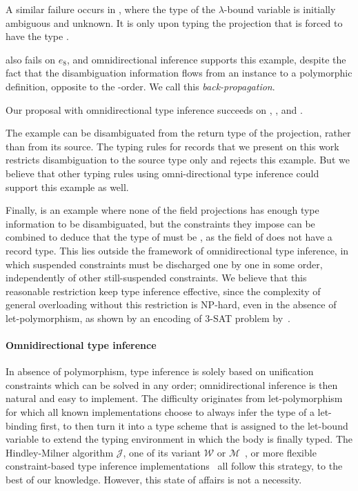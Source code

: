 \documentclass[acmsmall,screen,nonacm,review]{acmart}
\begin{document}
A similar failure occurs in , where the type of the
$\lambda$-bound variable  is initially ambiguous and
unknown. It is only upon typing the projection  that
 is forced to have the type .

\OCaml also fails on \ocaml$e_8$, and omnidirectional inference
supports this example, despite the fact that the disambiguation
information flows from an instance to a polymorphic definition, opposite to the \Geninst-order. We
call this \emph{back-propagation}.

%
Our proposal with omnidirectional type inference succeeds
on , , and .

The example  can be disambiguated from the return type of
the projection, rather than from its source. The typing rules for
records that we present on this work restricts disambiguation to the
source type only and rejects this example. But we believe that other
typing rules using omni-directional type inference could support this
example as well.

Finally,  is an example where none of the field
projections has enough type information to be disambiguated, but the
constraints they impose can be combined to deduce that the type of
 must be , as the  field of 
does not have a record type. This lies outside the framework of
omnidirectional type inference, in which suspended constraints must be
discharged one by one in some order, independently of other
still-suspended constraints.
%
We believe that this reasonable restriction keep type inference effective,
since the complexity of general overloading without this restriction is
NP-hard, even in the absence of let-polymorphism, as shown by an encoding of
3-SAT problem by~\citet*
{Chargueraud-Bodin-Dunfield-Riboulet/jfla2025}.

\paragraph{Omnidirectional type inference}

In absence of polymorphism, type inference is solely based on
unification constraints which can be solved in any order;
omnidirectional inference is then natural and easy to implement.  The
difficulty originates from \ML let-polymorphism for which all known
implementations choose to always infer the type of a let-binding
first, to then turn it into a type scheme that is assigned to the
let-bound variable to extend the typing environment in which the body
is finally typed. The Hindley-Milner algorithm $\mathcal{J}$, one of
its variant $\mathcal{W}$ or $\mathcal{M}$~\cite
{Lee_Yi/algoM@toplas1998}, or more flexible constraint-based type
inference
implementations~\citep*{Remy/mleth,Remy/thesis,Odersky-Sulzmann-Wehr@tpos,Pottier-Remy/emlti}
all follow this strategy, to the best of our knowledge. However, this
state of affairs is not a necessity.
\end{document}
